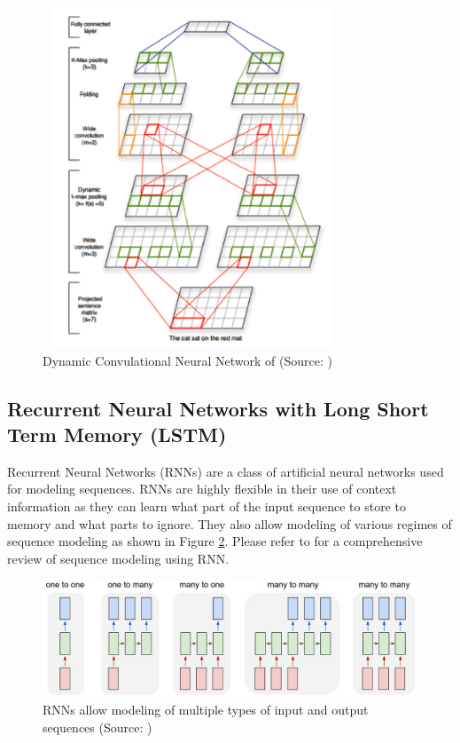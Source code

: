 \documentclass{article} %
\begin{document}
\begin{figure}
	\centering
	\includegraphics[height=4in, width=0.8\textwidth]{figs/DCNN.png}
	\caption{Dynamic Convulational Neural Network of \cite{kalchbrenner2014convolutional} (Source: \cite{kalchbrenner2014convolutional})}
	\label{fig:dcnn}
\end{figure}

\subsection{Recurrent Neural Networks with Long Short Term Memory (LSTM)}
Recurrent Neural Networks (RNNs) are a class of artificial neural networks used for modeling sequences.
RNNs are highly flexible in their use of context information as they can learn what part of the input sequence to store to memory and what parts to ignore. They also allow modeling of various regimes of sequence modeling as shown in Figure \ref{fig:rnn}. Please refer to \cite{graves2012supervised} for a comprehensive review of sequence modeling using RNN.

\begin{figure}[t]
	\centering
	\includegraphics[width=\textwidth]{figs/rnn.jpeg}
	\caption{RNNs allow modeling of multiple types of input and output sequences (Source: \cite{karpathy-rnn})}
	\label{fig:rnn}
\end{figure}
\end{document}
